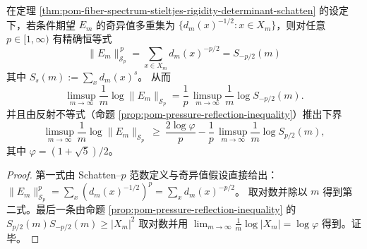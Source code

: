 \begin{corollary}\label{cor:pom-conditional-expectation-schatten-negative-pressure}
在定理 \ref{thm:pom-fiber-spectrum-stieltjes-rigidity-determinant-schatten} 的设定下，若条件期望 \(E_m\) 的奇异值多重集为 \(\{d_m(x)^{-1/2}:x\in X_m\}\)，则对任意 \(p\in[1,\infty)\) 有精确恒等式
\[
\boxed{\;
\|E_m\|_{\mathcal S_p}^{\,p}=\sum_{x\in X_m}d_m(x)^{-p/2}=S_{-p/2}(m)\;}
\]
其中 \(S_s(m):=\sum_x d_m(x)^s\)。
从而
\[
\limsup_{m\to\infty}\frac{1}{m}\log\|E_m\|_{\mathcal S_p}
=\frac{1}{p}\,\limsup_{m\to\infty}\frac{1}{m}\log S_{-p/2}(m).
\]
并且由反射不等式（命题 \ref{prop:pom-pressure-reflection-inequality}）推出下界
\[
\limsup_{m\to\infty}\frac{1}{m}\log\|E_m\|_{\mathcal S_p}
\ \ge\ \frac{2\log\varphi}{p}-\frac{1}{p}\,\limsup_{m\to\infty}\frac{1}{m}\log S_{p/2}(m),
\]
其中 \(\varphi=(1+\sqrt5)/2\)。
\end{corollary}
\begin{proof}
第一式由 Schatten--\(p\) 范数定义与奇异值假设直接给出：
\(
\|E_m\|_{\mathcal S_p}^p=\sum_x (d_m(x)^{-1/2})^p=\sum_x d_m(x)^{-p/2}
\)。
取对数并除以 \(m\) 得到第二式。最后一条由命题 \ref{prop:pom-pressure-reflection-inequality} 的
\(
S_{p/2}(m)S_{-p/2}(m)\ge |X_m|^2
\)
取对数并用 \(\lim_{m\to\infty}\frac{1}{m}\log|X_m|=\log\varphi\) 得到。证毕。
\end{proof}

\endinput
